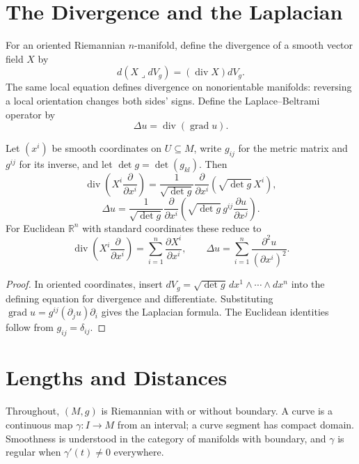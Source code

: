 \section{The Divergence and the Laplacian}

For an oriented Riemannian $n$-manifold, define the divergence of a smooth vector field $X$ by
\begin{equation}
d(X\lrcorner dV_g)=(\operatorname{div}X)dV_g. \tag{2.19}
\end{equation}
The same local equation defines divergence on nonorientable manifolds: reversing a local orientation changes both sides' signs. Define the Laplace--Beltrami operator by
\begin{equation}
\Delta u=\operatorname{div}(\operatorname{grad}u). \tag{2.20}
\end{equation}

\begin{proposition}
\label{prop:coordinate-representations-divergence-laplacian}
Let $(x^i)$ be smooth coordinates on $U\subseteq M$, write $g_{ij}$ for the metric matrix and $g^{ij}$ for its inverse, and let $\det g=\det(g_{kl})$. Then
\[
\operatorname{div}\left(X^i\frac{\partial}{\partial x^i}\right)=\frac{1}{\sqrt{\det g}}\frac{\partial}{\partial x^i}\left(\sqrt{\det g}\,X^i\right),
\]
\[
\Delta u=\frac{1}{\sqrt{\det g}}\frac{\partial}{\partial x^i}\left(\sqrt{\det g}\,g^{ij}\frac{\partial u}{\partial x^j}\right).
\]
For Euclidean $\mathbb R^n$ with standard coordinates these reduce to
\[
\operatorname{div}\left(X^i\frac{\partial}{\partial x^i}\right)=\sum_{i=1}^n\frac{\partial X^i}{\partial x^i},
\qquad
\Delta u=\sum_{i=1}^n\frac{\partial^2u}{(\partial x^i)^2}.
\]
\end{proposition}

\begin{proof}
\sketch In oriented coordinates, insert
$dV_g=\sqrt{\det g}\,dx^1\wedge\cdots\wedge dx^n$ into the defining equation
for divergence and differentiate. Substituting
$\operatorname{grad}u=g^{ij}(\partial_j u)\partial_i$ gives the Laplacian
formula. The Euclidean identities follow from $g_{ij}=\delta_{ij}$.
\end{proof}
\section{Lengths and Distances}

Throughout, $(M,g)$ is Riemannian with or without boundary. A curve is a continuous map $\gamma:I\to M$ from an interval; a curve segment has compact domain. Smoothness is understood in the category of manifolds with boundary, and $\gamma$ is regular when $\gamma'(t)\ne0$ everywhere.

